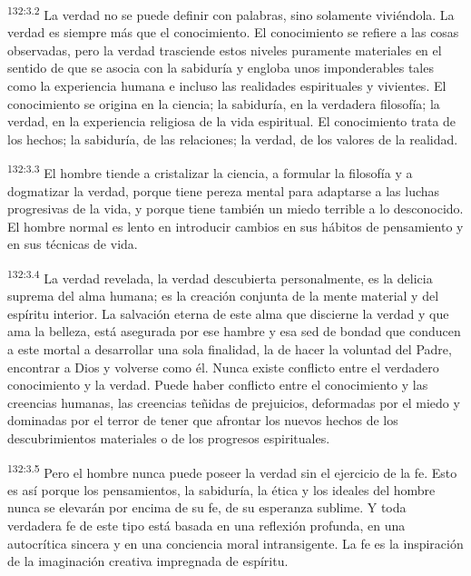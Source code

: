 \par 
\textsuperscript{132:3.2} La verdad no se puede definir con palabras, sino solamente viviéndola. La verdad es siempre más que el conocimiento. El conocimiento se refiere a las cosas observadas, pero la verdad trasciende estos niveles puramente materiales en el sentido de que se asocia con la sabiduría y engloba unos imponderables tales como la experiencia humana e incluso las realidades espirituales y vivientes. El conocimiento se origina en la ciencia; la sabiduría, en la verdadera filosofía; la verdad, en la experiencia religiosa de la vida espiritual. El conocimiento trata de los hechos; la sabiduría, de las relaciones; la verdad, de los valores de la realidad.

\par 
\textsuperscript{132:3.3} El hombre tiende a cristalizar la ciencia, a formular la filosofía y a dogmatizar la verdad, porque tiene pereza mental para adaptarse a las luchas progresivas de la vida, y porque tiene también un miedo terrible a lo desconocido. El hombre normal es lento en introducir cambios en sus hábitos de pensamiento y en sus técnicas de vida.

\par 
\textsuperscript{132:3.4} La verdad revelada, la verdad descubierta personalmente, es la delicia suprema del alma humana; es la creación conjunta de la mente material y del espíritu interior. La salvación eterna de este alma que discierne la verdad y que ama la belleza, está asegurada por ese hambre y esa sed de bondad que conducen a este mortal a desarrollar una sola finalidad, la de hacer la voluntad del Padre, encontrar a Dios y volverse como él. Nunca existe conflicto entre el verdadero conocimiento y la verdad. Puede haber conflicto entre el conocimiento y las creencias humanas, las creencias teñidas de prejuicios, deformadas por el miedo y dominadas por el terror de tener que afrontar los nuevos hechos de los descubrimientos materiales o de los progresos espirituales.

\par 
\textsuperscript{132:3.5} Pero el hombre nunca puede poseer la verdad sin el ejercicio de la fe. Esto es así porque los pensamientos, la sabiduría, la ética y los ideales del hombre nunca se elevarán por encima de su fe, de su esperanza sublime. Y toda verdadera fe de este tipo está basada en una reflexión profunda, en una autocrítica sincera y en una conciencia moral intransigente. La fe es la inspiración de la imaginación creativa impregnada de espíritu.

